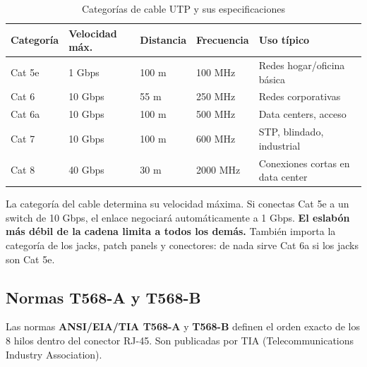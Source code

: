 \begin{table}[h!]
\centering
\renewcommand{\arraystretch}{1.4}
\begin{tabular}{lllll}
\toprule
\textbf{Categoría} & \textbf{Velocidad máx.} & \textbf{Distancia} & \textbf{Frecuencia} & \textbf{Uso típico} \\
\midrule
Cat 5e  & 1 Gbps      & 100 m & 100 MHz  & Redes hogar/oficina básica \\
Cat 6   & 10 Gbps     & 55 m  & 250 MHz  & Redes corporativas \\
Cat 6a  & 10 Gbps     & 100 m & 500 MHz  & Data centers, acceso \\
Cat 7   & 10 Gbps     & 100 m & 600 MHz  & STP, blindado, industrial \\
Cat 8   & 40 Gbps     & 30 m  & 2000 MHz & Conexiones cortas en data center \\
\bottomrule
\end{tabular}
\caption{Categorías de cable UTP y sus especificaciones}
\end{table}

\begin{cuidado}
La categoría del cable determina su velocidad máxima. Si conectas Cat 5e
a un switch de 10 Gbps, el enlace negociará automáticamente a 1 Gbps.
\textbf{El eslabón más débil de la cadena limita a todos los demás.}
También importa la categoría de los jacks, patch panels y conectores: de nada
sirve Cat 6a si los jacks son Cat 5e.
\end{cuidado}

\subsection{Normas T568-A y T568-B}

\begin{concepto}
Las normas \textbf{ANSI/EIA/TIA T568-A} y \textbf{T568-B} definen el orden
exacto de los 8 hilos dentro del conector RJ-45. Son publicadas por TIA
(Telecommunications Industry Association).
\end{concepto}

